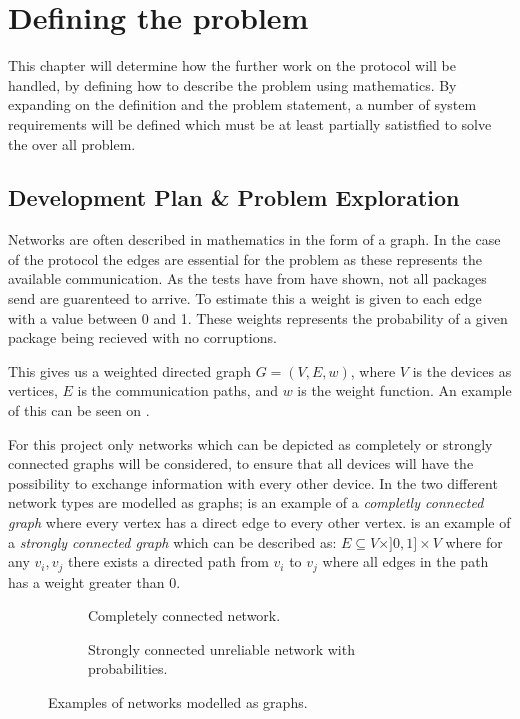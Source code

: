\chapter{Defining the problem}
This chapter will determine how the further work on the protocol will be handled, by defining how to describe the problem using mathematics. 
By expanding on the definition and the problem statement, a number of system requirements will be defined which must be at least partially satistfied to solve the over all problem.


\section{Development Plan \& Problem Exploration}\label{chp:Problems}
Networks are often described in mathematics in the form of a graph. 
In the case of the protocol the edges are essential for the problem as these represents the available communication.
As the tests have from  have shown, not all packages send are guarenteed to arrive.
To estimate this a weight is given to each edge with a value between 0 and 1.
These weights represents the probability of a given package being recieved with no corruptions.

This gives us a weighted directed graph $G = (V, E, w)$, where $V$ is the devices as vertices, $E$ is the communication paths, and $w$ is the weight function.
An example of this can be seen on .

For this project only networks which can be depicted as completely or strongly connected graphs will be considered, to ensure that all devices will have the possibility to exchange information with every other device.
In  the two different network types are modelled as graphs; 
 is an example of a \emph{completly connected graph} where every vertex has a direct edge to every other vertex.
 is an example of a \emph{strongly connected graph} which can be described as: $E \subseteq V \times ]0,1] \times V$ where for any $v_i, v_j$ there exists a directed path from $v_i$ to $v_j$ where all edges in the path has a weight greater than 0.

\begin{figure}[h]
    \begin{subfigure}{0.5\linewidth}
        \centering
        
        \caption{Completely connected network.}
        \label{fig:ccrcnetworkgraph}
    \end{subfigure}\hfill
    \begin{subfigure}{0.5\linewidth}
        \centering
        
        \caption{Strongly connected unreliable network with probabilities.}
        \label{fig:network}
    \end{subfigure}
    \caption{Examples of networks modelled as graphs.}
    \label{fig:examplenetworkgraphs} 
\end{figure}

